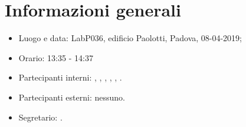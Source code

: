 \section{Informazioni generali}
\begin{itemize}
    \item Luogo e data: LabP036, edificio Paolotti, Padova, 08-04-2019;
    \item Orario: 13:35 - 14:37
    \item Partecipanti interni: \valentin{}, \francesco{}, \daniele{}, \singh{}, \davide{}, \andrea{}.
    \item Partecipanti esterni: nessuno.
    \item Segretario: \francesco{}.
\end{itemize}
